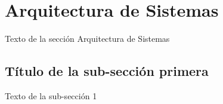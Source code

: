 \section{Arquitectura de Sistemas}

Texto de la sección Arquitectura de Sistemas


\subsection{Título de la sub-sección primera}

Texto de la sub-sección 1
